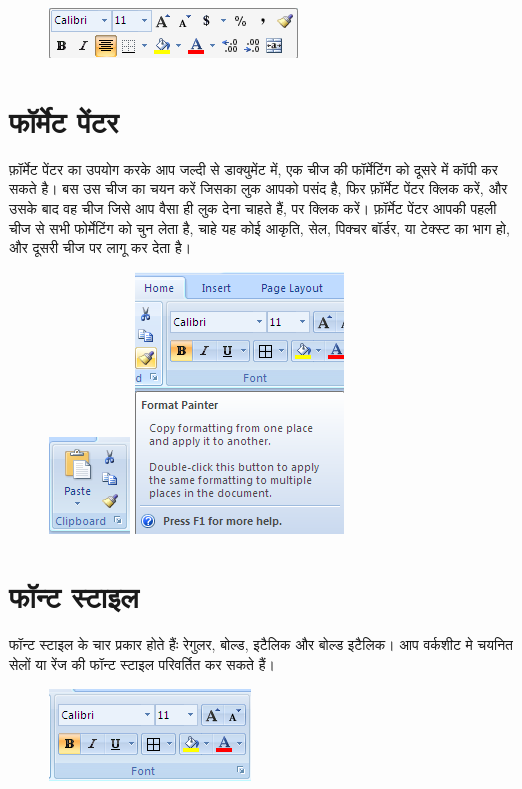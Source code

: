 \begin{figure}[H]
\centering
\includegraphics{src/images/chapter2/chapter2_fig03.png}
\end{figure}


\section{फॉर्मेट पेंटर}\label{id-2.1}

फ़ॉर्मेट पेंटर का उपयोग करके आप जल्दी से डाक्युमेंट में, एक चीज की फॉर्मेटिंग को दूसरे में कॉपी कर सकते है। बस उस चीज का चयन करें जिसका लुक आपको पसंद है, फिर फ़ॉर्मेट पेंटर क्लिक करें, और उसके बाद वह चीज जिसे आप वैसा ही लुक देना चाहते हैं, पर क्लिक करें। फ़ॉर्मेट पेंटर आपकी पहली चीज से सभी फोर्मेटिंग को चुन लेता है, चाहे यह कोई आकृति, सेल, पिक्चर बॉर्डर, या टेक्स्ट का भाग हो, और दूसरी चीज पर लागू कर देता है।
\begin{figure}[H]
\centering
\includegraphics[scale=.87]{src/images/chapter2/chapter2_fig04.png}\qquad
\includegraphics[scale=.87]{src/images/chapter2/chapter2_fig05.png}
\end{figure}

\section{फॉन्ट स्टाइल}\label{id-2.2}

फॉन्ट स्टाइल के चार प्रकार होते हैंः रेगुलर, बोल्ड, इटैलिक और बोल्ड इटैलिक। आप वर्कशीट मे चयनित सेलों या रेंज की फॉन्ट स्टाइल परिवर्तित कर सकते हैं।
\begin{figure}[H]
\centering
\includegraphics[scale=.8]{src/images/chapter2/chapter2_fig06.png}
\end{figure}


